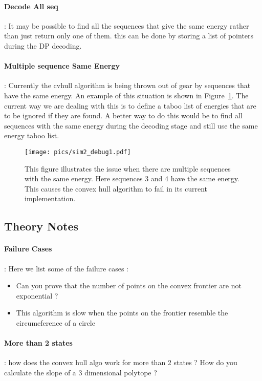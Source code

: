 \documentclass{article}
\begin{document}
\paragraph{Decode All seq} : It may be possible to find all the sequences that give the same energy rather than just return only one of them. this can be done by storing a list of pointers during the DP 
decoding.

\paragraph{Multiple sequence Same Energy} :  Currently the cvhull algorithm is being thrown out of gear by sequences that have the same energy. An example of this situation is shown in Figure~\ref{fig:sim2_debug1}. The current way we are dealing with this is to define a taboo list of energies that are to be ignored if they are found. A better way to do this would be to find all sequences with the same energy during the decoding stage and still use the same energy taboo list. 


\begin{figure}[h!]
    \centering
    \texttt{[image: pics/sim2\_debug1.pdf]}
    \caption{This figure illustrates the issue when there are multiple sequences with the same energy. Here sequences 3 and 4 have the same energy. This causes the convex hull algorithm to fail in its current implementation.   }
    \label{fig:sim2_debug1}
\end{figure}
\pagebreak


\subsection{Theory Notes}

\paragraph{Failure Cases} : Here we list some of the failure cases : 
\begin{itemize}
\item Can you prove that the number of points on the convex frontier are not exponential ?
\item This algorithm is slow when the points on the frontier resemble the circumeference of a circle
\end{itemize}

\paragraph{More than 2 states } : how does the convex hull algo work for more than 2 states ? How do you calculate the slope of a 3 dimensional polytope ?
\end{document}
